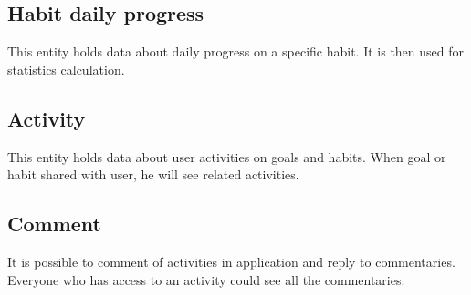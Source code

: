 \subsection{Habit daily progress}\label{subsec:habit-daily-progress}

This entity holds data about daily progress on a specific habit.
It is then used for statistics calculation.

\subsection{Activity}\label{subsec:activity}

This entity holds data about user activities on goals and habits.
When goal or habit shared with user, he will see related activities.

\subsection{Comment}\label{subsec:comment}

It is possible to comment of activities in application and reply to commentaries.
Everyone who has access to an activity could see all the commentaries.